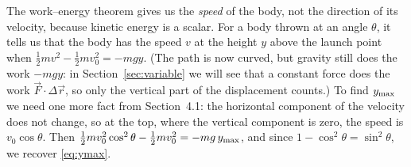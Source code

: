 \documentclass[11pt,a4paper]{article}
\begin{document}
The work--energy theorem gives us the \emph{speed} of the body, not the direction of its velocity,
because kinetic energy is a scalar. For a body thrown at an angle $\theta$, it tells us that the body
has the speed $v$ at the height $y$ above the launch point when $\frac12 mv^2 - \frac12 mv_0^2 =
-mgy$. (The path is now curved, but gravity still does the work $-mgy$: in
Section~\ref{sec:variable} we will see that a constant force does the work
$\vec{F}\cdot\Delta\vec{r}$, so only the vertical part of the displacement counts.) To find
$y_{\mathrm{max}}$ we need one more fact from Section~4.1: the horizontal component of the velocity does not
change, so at the top, where the vertical component is zero, the speed is $v_0\cos\theta$. Then
$\frac12 mv_0^2\cos^2\theta - \frac12 mv_0^2 = -mg\,y_{\mathrm{max}}$, and since
$1 - \cos^2\theta = \sin^2\theta$, we recover \eqref{eq:ymax}.
\end{document}
